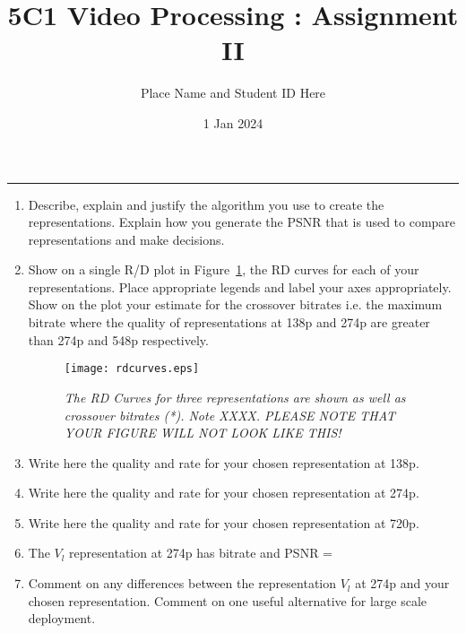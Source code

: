 \documentclass[a4paper]{article}
\title{5C1 Video Processing :  Assignment II}
\author{Place Name and Student ID Here}
\date{1 Jan 2024}  %
\begin{document}
\maketitle%
\vspace*{1\baselineskip}
\hrule
\large


\begin{enumerate}
    \item Describe, explain and justify the algorithm you use to create the representations. Explain how you generate the PSNR that is used to compare representations and make decisions. \\
    \item Show on a single R/D plot in Figure~\ref{rd}, the RD curves for each of your representations. Place appropriate legends and label your axes appropriately. Show on the plot your estimate for the crossover bitrates i.e. the maximum bitrate where the quality of representations at 138p and 274p are greater than 274p and 548p respectively.
    \begin{figure}     
    \centering
    \texttt{[image: rdcurves.eps]}
    \caption{\em The RD Curves for three representations are shown as well as crossover bitrates (*). Note XXXX. PLEASE NOTE THAT YOUR FIGURE WILL NOT LOOK LIKE THIS! \label{rd}}
\end{figure}
    \item Write here the quality and rate for your chosen representation at 138p.  
    \item Write here the quality and rate for your chosen representation at 274p.  
    \item Write here the quality and rate for your chosen representation at 720p.  
    \item The $V_l$ representation at 274p has bitrate and PSNR = 
    \item Comment on any differences between the  representation $V_l$ at 274p and your chosen representation. Comment on one useful alternative for large scale deployment. \\
    
        
\end{enumerate}
\end{document}
